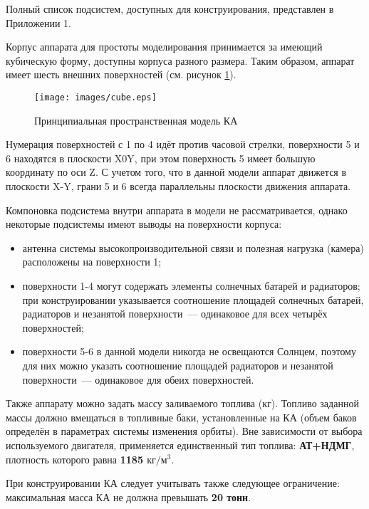 \documentclass[12pt,a4paper]{article}
\begin{document}
Полный список подсистем, доступных для конструирования, представлен в Приложении 1.

Корпус аппарата для простоты моделирования принимается за имеющий кубическую форму,
доступны корпуса разного размера. Таким образом, аппарат имеет шесть внешних поверхностей
(см. рисунок \ref{Pic:cube}).

\begin{figure}[tbh]
  \begin{center}
    \texttt{[image: images/cube.eps]}
    \caption{Принципиальная пространственная модель КА}
    \label{Pic:cube}
  \end{center}
\end{figure}

Нумерация поверхностей с 1 по 4 идёт против часовой стрелки, поверхности 5 и 6 находятся в
плоскости X0Y, при этом поверхность 5 имеет большую координату по оси Z. С учетом того,
что в данной модели аппарат движется в плоскости X-Y, грани 5 и 6 всегда параллельны
плоскости движения аппарата.

Компоновка подсистема внутри аппарата в модели не рассматривается, однако некоторые
подсистемы имеют выводы на поверхности корпуса:

\begin{itemize}
\item антенна системы высокопроизводительной связи и полезная нагрузка (камера)
  расположены на поверхности 1;
\item поверхности 1-4 могут содержать элементы солнечных батарей и радиаторов; при
  конструировании указывается соотношение площадей солнечных батарей, радиаторов и
  незанятой поверхности~--– одинаковое для всех четырёх поверхностей;
\item поверхности 5-6 в данной модели никогда не освещаются Солнцем, поэтому для них можно
  указать соотношение площадей радиаторов и незанятой поверхности~--– одинаковое для обеих
  поверхностей.
\end{itemize}

Также аппарату можно задать массу заливаемого топлива (кг). Топливо заданной массы должно
вмещаться в топливные баки, установленные на КА (объем баков определён в параметрах
системы изменения орбиты). Вне зависимости от выбора используемого двигателя, применяется
единственный тип топлива: \textbf{АТ+НДМГ}, плотность которого равна \textbf{1185
  $\text{кг}/\text{м}^3$}.

При конструировании КА следует учитывать также следующее ограничение: максимальная масса
КА не должна превышать \textbf{20 тонн}.
\end{document}
